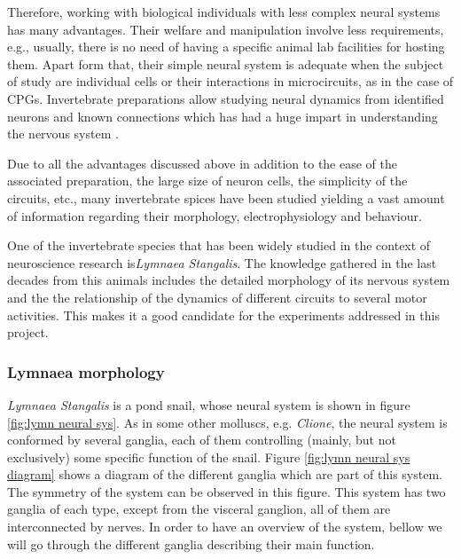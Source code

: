 Therefore, working with biological individuals with less complex neural systems has many advantages. Their welfare and manipulation involve less requirements, e.g., usually, there is no need of having a specific animal lab facilities for hosting them. Apart form that, their simple neural system is adequate when the subject of study are individual cells or their interactions in microcircuits, as in the case of CPGs. Invertebrate preparations allow studying neural dynamics from identified neurons and known connections which has had a huge impart in understanding the nervous system \cite{Katz2019}.

Due to all the advantages discussed above in addition to the ease of the associated preparation, the large size of neuron cells, the simplicity of the circuits, etc., many invertebrate spices have been studied yielding a vast amount of information regarding their morphology, electrophysiology and behaviour.


One of the invertebrate species that  has been widely studied in the context of neuroscience research is\textit{Lymnaea Stangalis}. The knowledge gathered in the last decades from this animals includes the detailed morphology of its nervous system and the the relationship of the dynamics of different circuits to several motor activities. This makes it a good candidate for the experiments addressed in this project. 

\subsubsection{Lymnaea morphology}

\textit{Lymnaea Stangalis} is a pond snail, whose neural system is shown in figure \ref{fig:lymn neural sys}. As in some other molluscs, e.g. {\sl Clione}, the neural system is conformed by several ganglia, each of them controlling (mainly, but not exclusively) some specific function of the snail. Figure \ref{fig:lymn neural sys diagram} shows a diagram of the different ganglia which are part of this system. The symmetry of the system can be observed in this figure. This system has two ganglia of each type, except from the visceral ganglion, all of them are interconnected by nerves. In order to have an overview of the system, bellow we will go through the different ganglia describing their main function. 

